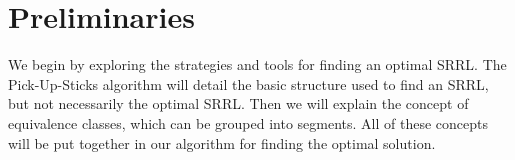 \section{Preliminaries}

We begin by exploring the strategies and tools for finding an optimal SRRL. The Pick-Up-Sticks algorithm will detail the basic structure used to find an SRRL, but not necessarily the optimal SRRL. Then we will explain the concept of equivalence classes, which can be grouped into segments. All of these concepts will be put together in our algorithm for finding the optimal solution.









